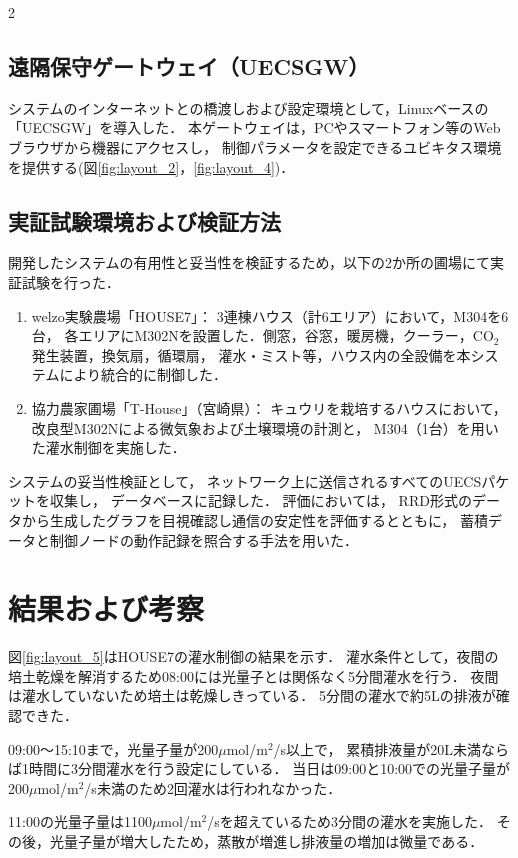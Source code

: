 \documentclass{jsaishoshiki}
\begin{document}
\begin{multicols}{2}
\subsection{遠隔保守ゲートウェイ（UECSGW）}

システムのインターネットとの橋渡しおよび設定環境として，Linuxベースの「UECSGW」を導入した．
本ゲートウェイは，PCやスマートフォン等のWebブラウザから機器にアクセスし，%
制御パラメータを設定できるユビキタス環境を提供する(図\ref{fig:layout_2}，\ref{fig:layout_4})．

\subsection{実証試験環境および検証方法}
開発したシステムの有用性と妥当性を検証するため，以下の2か所の圃場にて実証試験を行った．
\begin{enumerate}
\item welzo実験農場「HOUSE7」： 3連棟ハウス（計6エリア）において，M304を6台，%
  各エリアにM302Nを設置した．側窓，谷窓，暖房機，クーラー，CO$_2$発生装置，換気扇，循環扇，%
  灌水・ミスト等，ハウス内の全設備を本システムにより統合的に制御した．
\item 協力農家圃場「T-House」（宮崎県）： キュウリを栽培するハウスにおいて，%
  改良型M302Nによる微気象および土壌環境の計測と，%
  M304（1台）を用いた灌水制御を実施した．
\end{enumerate}

システムの妥当性検証として，
ネットワーク上に送信されるすべてのUECSパケットを収集し，%
データベースに記録した．%
評価においては，%
RRD形式のデータから生成したグラフを目視確認し通信の安定性を評価するとともに，%
蓄積データと制御ノードの動作記録を照合する手法を用いた．

\section{結果および考察}
図\ref{fig:layout_5}はHOUSE7の灌水制御の結果を示す．%
灌水条件として，夜間の培土乾燥を解消するため08:00には光量子とは関係なく5分間灌水を行う．
夜間は灌水していないため培土は乾燥しきっている．
5分間の灌水で約5Lの排液が確認できた．

09:00〜15:10まで，光量子量が200$\mu$mol/m$^2$/s以上で，
累積排液量が20L未満ならば1時間に3分間灌水を行う設定にしている．
当日は09:00と10:00での光量子量が200$\mu$mol/m$^2$/s未満のため2回灌水は行われなかった．

11:00の光量子量は1100$\mu$mol/m$^2$/sを超えているため3分間の灌水を実施した．
その後，光量子量が増大したため，蒸散が増進し排液量の増加は微量である．


\end{multicols}
\end{document}
